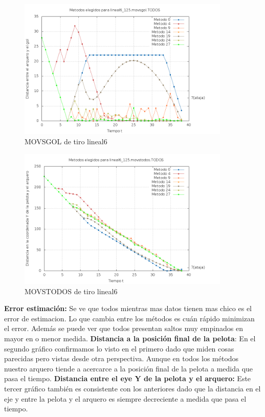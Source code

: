 \begin{figure}[H]
\begin{center}
\includegraphics[width=0.9\textwidth]{img/lineal6_125_movsgol_TODOS_elegidos.png}
     \caption{MOVSGOL de tiro lineal6}
\end{center}
\end{figure}


\begin{figure}[H]
\begin{center}
\includegraphics[width=0.9\textwidth]{img/lineal6_125_movstodos_TODOS_elegidos.png}
     \caption{MOVSTODOS de tiro lineal6}
\end{center}
\end{figure}

\textbf{Error estimación:} Se ve que todos mientras mas datos tienen mas chico es el error de
estimacion. Lo que cambia entre los métodos es cuán rápido minimizan el error.
Además se puede ver que todos presentan saltos muy empinados en mayor en o menor medida.
\textbf{Distancia a la posición final de la pelota}:
En el segundo gráfico confirmamos lo visto en el primero dado que miden cosas parecidas pero vistas
desde otra perspectiva. Aunque en todos los métodos nuestro arquero tiende a acercarce a la posición
final de la pelota a medida que pasa el tiempo.
\textbf{Distancia entre el eye Y de la pelota y el arquero:}
Este tercer gráfico también es consistente con los anteriores dado que la distancia en el eje y
entre la pelota y el arquero es siempre decreciente a medida que pasa el tiempo.



